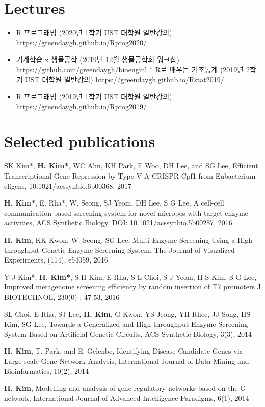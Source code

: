 \documentclass[
]{book}
\author{}
\date{\vspace{-2.5em}}
\providecommand{\tightlist}{%
  \setlength{\itemsep}{0pt}\setlength{\parskip}{0pt}}
\begin{document}
{
\setcounter{tocdepth}{1}
\tableofcontents
}
\hypertarget{lectures}{%
\section{Lectures}\label{lectures}}

\begin{itemize}
\tightlist
\item
  R 프로그래밍 (2020년 1학기 UST 대학원 일반강의) \url{https://greendaygh.github.io/Rprog2020/}
\item
  기계학습 x 생물공학 (2019년 12월 생물공학회 워크샵) \url{https://github.com/greendaygh/bioengml} * R로 배우는 기초통계 (2019년 2학기 UST 대학원 일반강의) \url{https://greendaygh.github.io/Rstat2019/}
\item
  R 프로그래밍 (2019년 1학기 UST 대학원 일반강의) \url{https://greendaygh.github.io/Rprog2019/}
\end{itemize}

\hypertarget{selected-publications}{%
\section{Selected publications}\label{selected-publications}}

SK Kim*, \textbf{H. Kim*}, WC Ahn, KH Park, E Woo, DH Lee, and SG Lee, Efficient Transcriptional Gene Repression by Type V-A CRISPR-Cpf1 from Eubacterium eligens, 10.1021/acssynbio.6b00368, 2017

\textbf{H. Kim*}, E. Rha*, W. Seong, SJ Yeom, DH Lee, S G Lee, A cell-cell communication-based screening system for novel microbes with target enzyme activities, ACS Synthetic Biology, DOI: 10.1021/acssynbio.5b00287, 2016

\textbf{H. Kim}, KK Kwon, W. Seong, SG Lee, Multi-Enzyme Screening Using a High-throughput Genetic Enzyme Screening System, The Journal of Visualized Experiments, (114), e54059, 2016

Y J Kim*, \textbf{H. Kim*}, S H Kim, E Rha, S-L Choi, S J Yeom, H S Kim, S G Lee, Improved metagenome screening efficiency by random insertion of T7 promoters J BIOTECHNOL, 230(0) : 47-53, 2016

SL Choi, E Rha, SJ Lee, \textbf{H. Kim}, G Kwon, YS Jeong, YH Rhee, JJ Song, HS Kim, SG Lee, Towards a Generalized and High-throughput Enzyme Screening System Based on Artificial Genetic Circuits, ACS Synthetic Biology, 3(3), 2014

\textbf{H. Kim}, T. Park, and E. Gelenbe, Identifying Disease Candidate Genes via Large-scale Gene Network Analysis, International Journal of Data Mining and Bioinformatics, 10(2), 2014

\textbf{H. Kim}, Modelling and analysis of gene regulatory networks based on the G-network, International Journal of Advanced Intelligence Paradigms, 6(1), 2014

  
\end{document}

